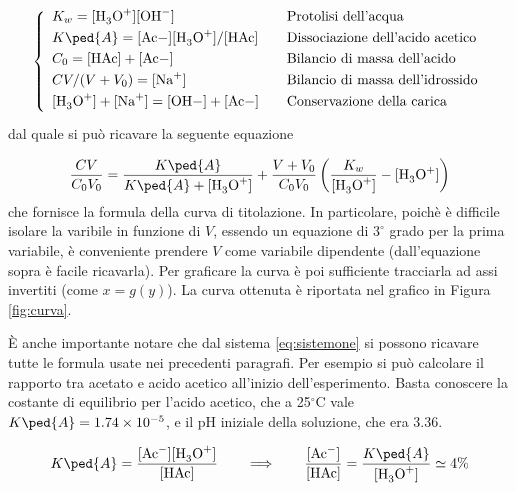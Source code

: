 \begin{equation}
    \left\{
    \begin{array}{l @\qquad l} \smallskip
        K_w = [\ce{H3O+}][\ce{OH-}] & \text{Protolisi dell'acqua} \\ \smallskip
        K\ped{A} = [\ce{Ac-]}[\ce{H3O+}]/[\ce{HAc}] & \text{Dissociazione dell'acido acetico} \\ \smallskip
        C_0 = \ce{[HAc] + [Ac-]} & \text{Bilancio di massa dell'acido} \\ \smallskip
        CV/(V + V_0) = [\ce{Na+}] & \text{Bilancio di massa dell'idrossido} \\ \smallskip
        \ce{[H3O+] + [Na+] = [OH-] + [Ac-]} & \text{Conservazione della carica} \\
    \end{array}
    \right.
    \label{eq:sistemone}
\end{equation}
%
dal quale si può ricavare la seguente equazione

\begin{equation}
    \frac{CV}{C_0V_0} = \frac{K\ped{A}}{K\ped{A} + \ce{[H3O+]}} + \frac{V + V_0}{C_0V_0} \left(\frac{K_w}{\ce{[H3O+]}} - \ce{[H3O+]} \right)
    \label{eq:curv}
\end{equation}
%
che fornisce la formula della curva di titolazione. In particolare, poichè è difficile isolare la varibile \ce{[H3O+]} in funzione di $V$, essendo
un equazione di $3^\circ$ grado per la prima variabile, è conveniente prendere $V$ come variabile dipendente 
(dall'equazione sopra è facile ricavarla). Per graficare la curva è poi sufficiente tracciarla ad assi invertiti (come $x = g(y)$).
La curva ottenuta è riportata nel grafico in Figura \ref{fig:curva}.

È anche importante notare che dal sistema \eqref{eq:sistemone} si possono ricavare tutte le formula usate nei precedenti paragrafi. Per esempio si può calcolare il rapporto tra acetato e acido acetico all'inizio dell'esperimento. Basta conoscere la costante di equilibrio per l'acido acetico, che a 25$^\circ$C vale
$K\ped{A} = 1.74 \times 10^{-5}$, e il pH iniziale della soluzione, che era 3.36.

\begin{equation}
    K\ped{A} = \frac{[\ce{Ac-}][\ce{H3O+}]}{[\ce{HAc}]} \qquad
    \Longrightarrow \qquad \frac{[\ce{Ac-}]}{[\ce{HAc}]} = \frac{K\ped{A}}{[\ce{H3O+}]} \simeq 4\%
    \label{eq:massa}
\end{equation}
